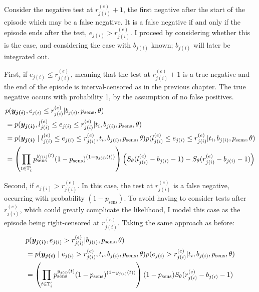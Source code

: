 \documentclass[thesis.tex]{subfiles}
\begin{document}
Consider the negative test at $r_{j(i)}^{(e)}+1$, the first negative after the start of the episode which may be a false negative.
It is a false negative if and only if the episode ends after the test, \ie $e_{j(i)} > r_{j(i)}^{(e)}$.
I proceed by considering whether this is the case, and considering the case with $b_{j(i)}$ known; $b_{j(i)}$ will later be integrated out.

First, if $e_{j(i)} \leq r_{j(i)}^{(e)}$, meaning that the test at $r_{j(i)}^{(e)}+1$ is a true negative and the end of the episode is interval-censored as in the previous chapter.
The true negative occurs with probability 1, by the assumption of no false positives.
\begin{align}
&p(\vec{y_{j(i)}}, e_{j(i)} \leq r_{j(i)}^{(e)} | b_{j(i)}, p_\text{sens}, \theta) \\
&= p(\vec{y_{j(i)}}, l_{j(i)}^{(e)} \leq e_{j(i)} \leq r_{j(i)}^{(e)} | t_i, b_{j(i)}, p_\text{sens}, \theta) \\ %
&= p(\vec{y_{j(i)}} \mid l_{j(i)}^{(e)} \leq e_{j(i)} \leq r_{j(i)}^{(e)}, t_i, b_{j(i)}, p_\text{sens}, \theta) p(l_{j(i)}^{(e)} \leq e_{j(i)} \leq r_{j(i)}^{(e)} | t_i, b_{j(i)}, p_\text{sens}, \theta) \\
&= \left( \prod_{t \in \sched'_i} p_\text{sens}^{y_{j(i)}(t)} (1 - p_\text{sens})^{(1 - y_{j(i)}(t))} \right) \left( S_\theta(l_{j(i)}^{(e)} - b_{j(i)} - 1) - S_\theta(r_{j(i)}^{(e)} - b_{j(i)} - 1) \right)
\label{imperf-test:eq:ll-ei-lt-ri}
\end{align}

Second, if $e_{j(i)} > r_{j(i)}^{(e)}$.
In this case, the test at $r_{j(i)}^{(e)}$ is a false negative, occurring with probability $(1 - p_\text{sens})$.
To avoid having to consider tests after $r_{j(i)}^{(e)}$, which could greatly complicate the likelihood, I model this case as the episode being right-censored at $r_{j(i)}^{(e)}$.
Taking the same approach as before:
\begin{align}
&p(\bm{y_{j(i)}}, e_{j(i)} > r_{j(i)}^{(e)} | b_{j(i)}, p_\text{sens}, \theta) \\
&= p(\bm{y_{j(i)}} \mid e_{j(i)} > r_{j(i)}^{(e)}, t_i, b_{j(i)}, p_\text{sens}, \theta) p(e_{j(i)} > r_{j(i)}^{(e)} | t_i, b_{j(i)}, p_\text{sens}, \theta) \\
&= \left( \prod_{t \in \mathbb{T}'_i} p_\text{sens}^{y_{j(i)}(t)} (1 - p_\text{sens})^{(1 - y_{j(i)}(t))} \right) (1 - p_\text{sens}) S_\theta(r_{j(i)}^{(e)} - b_{j(i)} - 1)
\label{imperf-test:eq:ll-ei-gt-ri}
\end{align}
\end{document}
